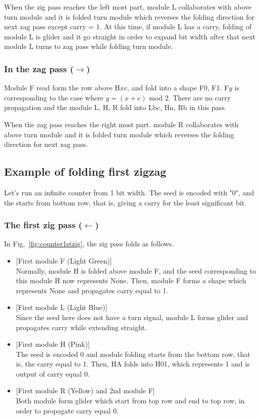 \documentclass[runningheads]{llncs}
\begin{document}
When the zig pass reaches the left most part, module L collaborates with above turn module and it is folded turn module which reverses the folding direction for next zag pass except carry = 1.
At this time, if module L has a carry, folding of module L is glider and it go straight in order to expand bit width after that next module L turns to zag pass while folding turn module.

\subsubsection{In the zag pass ($\rightarrow$)}
Module F read form the row above H$xc$, and fold into a shape F0, F1.
F$y$ is corresponding to the case where $y = (x + c)$ mod $2$.
There are no carry propagation and the module L, H, R fold into Lbc, Hn, Rb in this pass.

When the zag pass reaches the right most part. module R collaborates with above turn module and it is folded turn module which reverses the folding direction for next zag pass.

\subsection{Example of folding first zigzag}
Let's run an infinite counter from 1 bit width.
The seed is encoded with "0", and the starts from bottom row, that is, giving a carry for the least significant bit.

\subsubsection{The first zig pass ($\leftarrow$)}
In Fig,~\ref{fig:counter1stzig}, the zig pass folds as follows.
\begin{itemize}
\item{[First module F (Light Green)]} \\Normally, module H is folded above module F, and the seed corresponding to this module H now represents None.
Then, module F forms a shape which represents None and propagates carry equal to 1.
\item{[First module L (Light Blue)]} \\Since the seed here does not have a turn signal, module L forms glider and propagates carry while extending straight.

\item{[First module H (Pink)]} \\The seed is encoded 0 and module folding starts from the bottom row, that is, the carry equal to 1.
Then, HA folds into H01, which represents 1 and is output of carry equal 0.

\item{[First module R (Yellow) and 2nd module F]} \\Both module form glider which start from top row and end to top row, in order to propagate carry equal 0.

\end{itemize}
\end{document}
